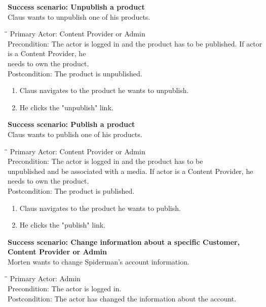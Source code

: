 \textbf{Success scenario: Unpublish a product} \\
Claus wants to unpublish one of his products.
\begin{tabbing}
\hspace{5mm}\=\hspace{26mm}\=\kill
\>Primary Actor:\> Content Provider or Admin\\
\>Precondition:\> The actor is logged in and the product has to be published. If actor is a Content Provider, he\\ \hspace{85px} needs to own the product.\\
\>Postcondition:\> The product is unpublished.
\end{tabbing}
\begin{enumerate} \setlength{\itemsep}{-1mm}
	\item Claus navigates to the product he wants to unpublish.
	\item He clicks the "unpublish" link.
\end{enumerate}
\vspace{3mm}
\textbf{Success scenario: Publish a product} \\
Claus wants to publish one of his products.
\begin{tabbing}
\hspace{5mm}\=\hspace{26mm}\=\kill
\>Primary Actor:\> Content Provider or Admin\\
\>Precondition:\> The actor is logged in and the product has to be\\ \hspace{85px} unpublished and be associated with a media. If actor is a Content Provider, he needs to own the product.\\
\>Postcondition:\> The product is published.
\end{tabbing}
\begin{enumerate} \setlength{\itemsep}{-1mm}
	\item Claus navigates to the product he wants to publish.
	\item He clicks the "publish" link.
\end{enumerate}
\vspace{3mm}
\textbf{Success scenario: Change information about a specific Customer, Content Provider or Admin} \\
Morten wants to change Spiderman's account information.
\begin{tabbing}
\hspace{5mm}\=\hspace{26mm}\=\kill
\>Primary Actor:\> Admin\\
\>Precondition:\> The actor is logged in.\\
\>Postcondition:\> The actor has changed the information about the account.
\end{tabbing}

